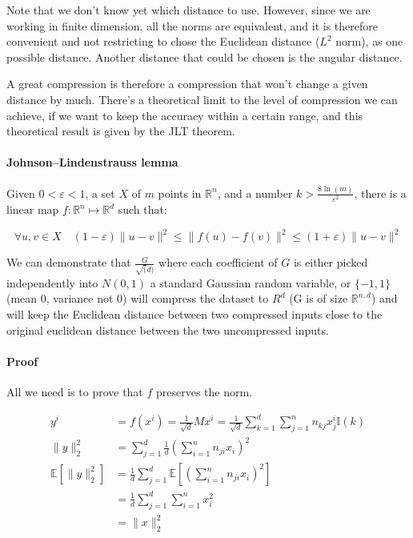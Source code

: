 \documentclass[11pt,a4paper]{article}
\begin{document}
	
	Note that we don't know yet which distance to use. However, since we are working in finite dimension, all the norms are equivalent, and it is therefore convenient and not restricting to chose the Euclidean distance ($L^2$ norm), as one possible distance. Another distance that could be chosen is the angular distance.
	
	A great compression is therefore a compression that won't change a given distance by much. There's a theoretical limit to the level of compression we can achieve, if we want to keep the accuracy within a certain range, and this theoretical result is given by the JLT theorem.
	
	
	\paragraph{Johnson–Lindenstrauss lemma}
	Given $0 < \varepsilon < 1$, a set $X$ of $m$ points in $\mathbb{R}^n$, and a number $k > \frac{8 \ln(m)}{\varepsilon^2}$, there is a linear map $f : \mathbb{R}^n \mapsto \mathbb{R}^d$ such that:
	
	\begin{equation}
		\forall u,v \in X \quad (1-\varepsilon)\|u-v\|^2 \leq \|f(u) - f(v)\|^2 \leq (1+\varepsilon)\|u-v\|^2
	\end{equation}
	

	We can demonstrate that $\frac{G}{\sqrt(d)}$ where each coefficient of $G$ is either picked independently into $N(0,1)$ a standard Gaussian random variable, or $\{-1,1\}$ (mean 0, variance not 0) will compress the dataset to $R^d$ (G is of size $\mathbb{R}^{n,d}$) and will keep the Euclidean distance between two compressed inputs close to the original euclidean distance between the two uncompressed inputs.
	
	\paragraph{Proof}
	All we need is to prove that $f$ preserves the norm. 
	
	\begin{align*}
		y^i  &= f(x^i) = \frac{1}{\sqrt{d}} M x^i = \frac{1}{\sqrt{d}} \sum_{k=1}^d \sum_{j=1}^{n} n_{kj} x_j^i \mathbb{I}(k)\\
		\|y \| _2^2 &= \sum_{j=1}^{d} \frac{1}{d} \left(\sum_{i=1}^{n} n_{ji} x_i \right)^2\\
		\mathbb{E}\left[\| y \|_2^2\right] &= \frac{1}{d}  \sum_{j=1}^{d} \mathbb{E} \left[\left(\sum_{i=1}^{n} n_{ji} x_i \right)^2\right]\\
		&= \frac{1}{d}  \sum_{j=1}^{d} \sum_{i=1}^{n} x_i^2 \\
		&= \|x\|^2_2
	\end{align*}
	
\end{document}
